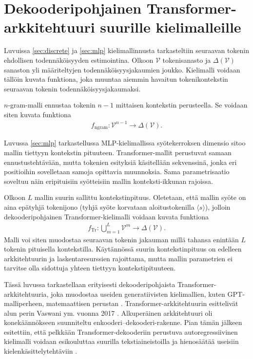 \section{Dekooderipohjainen Transformer-arkkitehtuuri suurille
kielimalleille}\label{sec:transformer}

Luvuissa \ref{sec:discrete} ja \ref{sec:mlp} kielimallinnusta
tarkasteltiin seuraavan tokenin ehdollisen todennäköisyyden estimointina.
Olkoon \(\mathcal{V}\) tokenisanasto ja
\(\Delta(\mathcal{V})\) sanaston yli määriteltyjen
todennäköisyysjakaumien joukko. Kielimalli voidaan tällöin kuvata
funktiona, joka muuntaa aiemmin havaitun tokenikontekstin seuraavan
tokenin todennäköisyysjakaumaksi.

\(n\)-gram-malli ennustaa tokenin \(n-1\) mittaisen kontekstin
perusteella. Se voidaan siten kuvata funktiona
\begin{align*}
  f_{\mathrm{ngram}}
  \colon
  \mathcal{V}^{n-1}
  \to
  \Delta(\mathcal{V}).
\end{align*}

Luvussa \ref{sec:mlp} tarkastellussa MLP-kielimallissa syötekerroksen dimensio sitoo mallin tiettyyn kontekstin pituuteen. Transformer-mallit perustuvat samaan ennustustehtävään, mutta tokenien esityksiä käsitellään sekvenssinä, jonka eri positioihin sovelletaan samoja opittavia muunnoksia. Sama parametrisaatio soveltuu näin eripituisiin syötteisiin mallin konteksti-ikkunan rajoissa.

Olkoon \(L\) mallin suurin sallittu
kontekstinpituus. Oletetaan, että mallin syöte on aina epätyhjä tokenijono (tyhjä syöte korvataan aloitustokenilla $\langle s \rangle$), jolloin dekooderipohjainen Transformer-kielimalli voidaan
kuvata funktiona
\begin{align*}
  f_{\mathrm{Tr}}
  \colon
  \bigcup_{m=1}^{L}\mathcal{V}^{m}
  \to
  \Delta(\mathcal{V}).
\end{align*}
Malli voi siten muodostaa seuraavan tokenin jakauman millä tahansa
enintään \(L\) tokenin pituisella kontekstilla. Käytännössä suurin
kontekstinpituus on edelleen arkkitehtuurin ja laskentaresurssien
rajoittama, mutta mallin parametrien ei tarvitse olla sidottuja yhteen
tiettyyn kontekstipituuteen.

Tässä luvussa tarkastellaan erityisesti dekooderipohjaista
Transformer-arkkiteh\-tuuria, joka muodostaa useiden generatiivisten
kielimallien, kuten GPT-malliper\-heen, matemaattisen perustan \cite{radford2018improving}.
Transformer-arkkitehtuurin esittelivät alun perin Vaswani ym. vuonna 2017
\cite{vaswani2017attention}. Alkuperäinen arkkitehtuuri oli
konekäännökseen suunniteltu enkooderi--dekooderi-rakenne. Pian tämän jälkeen esitettiin, että pelkkään Transformer-dekooderiin perustuva autoregressiivinen kielimalli voidaan esikouluttaa suurilla tekstiaineistoilla ja hienosäätää useisiin kielenkäsittelytehtäviin \cite{radford2018improving}.

